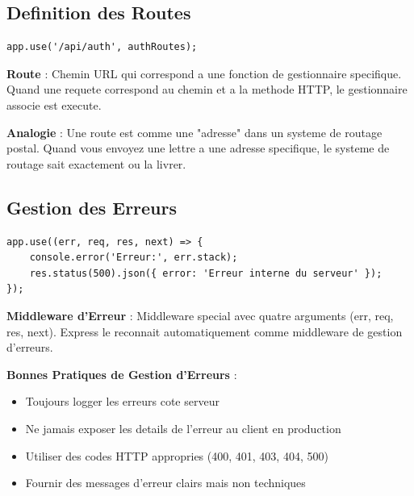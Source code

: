 \documentclass[a4paper,12pt]{book}
\begin{document}
\subsection{Definition des Routes}

\begin{lstlisting}[style=javascript]
app.use('/api/auth', authRoutes);
\end{lstlisting}

\begin{definitionbox}
    \textbf{Route} : Chemin URL qui correspond a une fonction de gestionnaire specifique. Quand une requete correspond au chemin et a la methode HTTP, le gestionnaire associe est execute.
\end{definitionbox}

\begin{analogybox}
    \textbf{Analogie} : Une route est comme une "adresse" dans un systeme de routage postal. Quand vous envoyez une lettre a une adresse specifique, le systeme de routage sait exactement ou la livrer.
\end{analogybox}

\subsection{Gestion des Erreurs}

\begin{lstlisting}[style=javascript]
app.use((err, req, res, next) => {
    console.error('Erreur:', err.stack);
    res.status(500).json({ error: 'Erreur interne du serveur' });
});
\end{lstlisting}

\begin{definitionbox}
    \textbf{Middleware d'Erreur} : Middleware special avec quatre arguments (err, req, res, next). Express le reconnait automatiquement comme middleware de gestion d'erreurs.
\end{definitionbox}

\begin{bestpracticebox}
    \textbf{Bonnes Pratiques de Gestion d'Erreurs} :
    \begin{itemize}
        \item Toujours logger les erreurs cote serveur
        \item Ne jamais exposer les details de l'erreur au client en production
        \item Utiliser des codes HTTP appropries (400, 401, 403, 404, 500)
        \item Fournir des messages d'erreur clairs mais non techniques
    \end{itemize}
\end{bestpracticebox}
\end{document}
